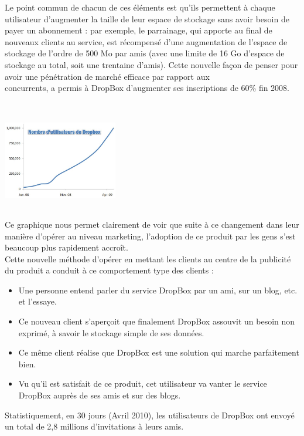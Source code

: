 \documentclass[a4paper, 10pt]{article}
\begin{document}
Le point commun de chacun de ces éléments est qu'ils permettent à chaque utilisateur d'augmenter la taille de leur espace de stockage
sans avoir besoin de payer un abonnement :
par exemple, le parrainage, qui apporte au final de nouveaux clients au service, est récompensé d'une augmentation de l'espace de stockage
de l'ordre de 500 Mo par amis (avec une limite de 16 Go d'espace de stockage au total, soit une trentaine d'amis).\newpage \noindent
Cette nouvelle façon de penser pour avoir une pénétration de marché efficace par rapport aux\\concurrents,
a permis à DropBox d'augmenter ses inscriptions de 60\% fin 2008.\\ \\
\includegraphics[height = 5cm, width = 5cm]{jpg/db8.jpg}\\
Ce graphique nous permet clairement de voir que suite à ce changement dans leur manière d'opérer au niveau marketing,
l'adoption de ce produit par les gens s'est beaucoup plus rapidement accroît.\\
Cette nouvelle méthode d'opérer en mettant les clients au centre de la publicité du produit a conduit à ce comportement type des clients :
\begin{itemize}
 \item Une personne entend parler du service DropBox par un ami, sur un blog, etc. et l'essaye.
 \item Ce nouveau client s'aperçoit que finalement DropBox assouvit un besoin non exprimé, à savoir le stockage simple de ses données.
 \item Ce même client réalise que DropBox est une solution qui marche parfaitement bien.
 \item Vu qu'il est satisfait de ce produit, cet utilisateur va vanter le service DropBox auprès de ses amis et sur des blogs.
\end{itemize}
Statistiquement, en 30 jours (Avril 2010), les utilisateurs de DropBox ont envoyé un total de 2,8 millions d'invitations à leurs amis.\\
\end{document}
